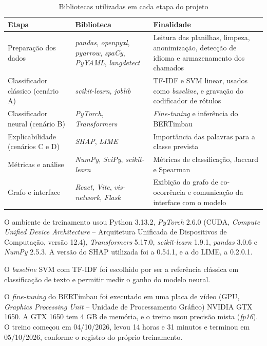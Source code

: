 \documentclass[
    12pt,                %
    openright,           %
    oneside,             %
    a4paper,             %
    english,             %
    brazil               %
]{abntex2}
\let\legendoriginal\legend
\renewcommand{\legend}[1]{\legendoriginal{\small #1}}
\begin{document}
\begin{table}[htb]
  \centering
  \caption{Bibliotecas utilizadas em cada etapa do projeto}
  \label{tab:ferramentas}
  \begin{tabular}{p{3.4cm}p{3.6cm}p{6.6cm}}
    \toprule
    Etapa & Biblioteca & Finalidade \\
    \midrule
    Preparação dos dados & \textit{pandas}, \textit{openpyxl}, \textit{pyarrow}, \textit{spaCy}, \textit{PyYAML}, \textit{langdetect} & Leitura das planilhas, limpeza, anonimização, detecção de idioma e armazenamento dos chamados \\
    Classificador clássico (cenário A) & \textit{scikit-learn}, \textit{joblib} & TF-IDF e SVM linear, usados como \textit{baseline}, e gravação do codificador de rótulos \\
    Classificador neural (cenário B) & \textit{PyTorch}, \textit{Transformers} & \textit{Fine-tuning} e inferência do BERTimbau \\
    Explicabilidade (cenários C e D) & \textit{SHAP}, \textit{LIME} & Importância das palavras para a classe prevista \\
    Métricas e análise & \textit{NumPy}, \textit{SciPy}, \textit{scikit-learn} & Métricas de classificação, Jaccard e Spearman \\
    Grafo e interface & \textit{React}, \textit{Vite}, \textit{vis-network}, \textit{Flask} & Exibição do grafo de co-ocorrência e comunicação da interface com o modelo \\
    \bottomrule
  \end{tabular}
  \legend{Fonte: Elaborado pelos autores.}
\end{table}

O ambiente de treinamento usou Python 3.13.2, \textit{PyTorch} 2.6.0 (CUDA, \textit{Compute Unified Device Architecture} -- Arquitetura Unificada de Dispositivos de Computação, versão 12.4), \textit{Transformers} 5.17.0, \textit{scikit-learn} 1.9.1, \textit{pandas} 3.0.6 e \textit{NumPy} 2.5.3. A versão do SHAP utilizada foi a 0.54.1, e a do LIME, a 0.2.0.1.

O \textit{baseline} SVM com TF-IDF foi escolhido por ser a referência clássica em classificação de texto e permitir medir o ganho do modelo neural.

O \textit{fine-tuning} do BERTimbau foi executado em uma placa de vídeo (GPU, \textit{Graphics Processing Unit} -- Unidade de Processamento Gráfico) NVIDIA GTX 1650. A GTX 1650 tem 4 GB de memória, e o treino usou precisão mista (\textit{fp16}). O treino começou em 04/10/2026, levou 14 horas e 31 minutos e terminou em 05/10/2026, conforme o registro do próprio treinamento.
\end{document}
